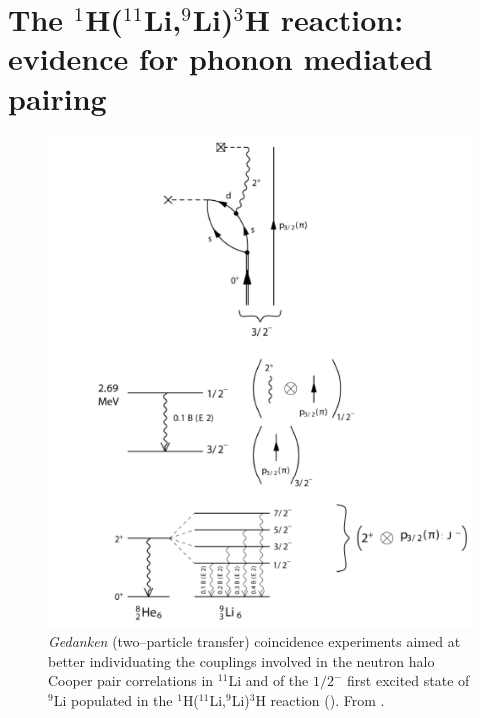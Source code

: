  \section[Evidence for phonon mediated pairing]{The $^1$H($^{11}$Li,$^9$Li)$^3$H reaction: evidence for phonon mediated pairing}\label{C8S1}
    \begin{figure}
    \centerline{\includegraphics*[width=16cm,angle=0]{C8/figsC8/fig8_1_3x}}
    	\caption{\emph{Gedanken} (two--particle transfer) coincidence experiments aimed at better individuating the couplings involved in the neutron halo Cooper pair correlations in $^{11}$Li and of the $1/2^-$ first excited state of $^9$Li populated in the  
    	 $^1$H($^{11}$Li,$^9$Li)$^3$H  reaction (\cite{Barranco:01,Potel:10}). From \cite{Potel:14}.}\label{fig8_1_3}
    \end{figure}
